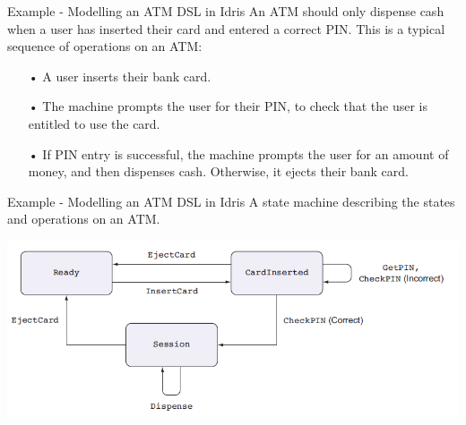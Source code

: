 \documentclass{beamer}
\newcommand{\dsltitle}{Example - Modelling an ATM DSL in Idris}
\begin{document}

\begin{frame}[fragile]{\dsltitle}
An ATM should only dispense cash when a user has inserted their
card and entered a correct PIN. This is a typical sequence of operations on an ATM:
\begin{enumerate}
\item[•] A user inserts their bank card.
\item[•] The machine prompts the user for their PIN, to check that the user is entitled to
use the card.
\item[•] If PIN entry is successful, the machine prompts the user for an amount of
money, and then dispenses cash. Otherwise, it ejects their bank card.
\end{enumerate}
\end{frame}

\begin{frame}[fragile]{\dsltitle}
A state machine describing the states and operations on an ATM.\\
\begin{center}
	\includegraphics[scale=0.5]{atm-model}
\end{center}
\end{frame}
\end{document}
